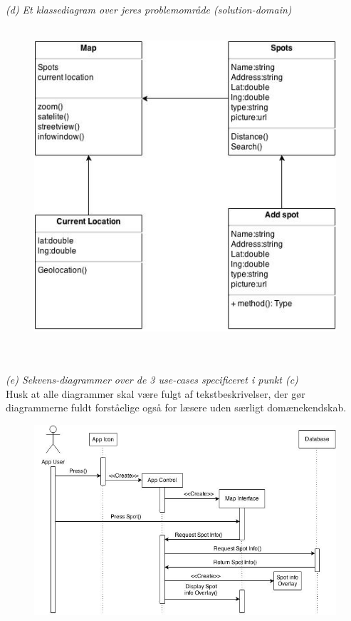 \documentclass[12pt]{article}
\begin{document}
\textit{(d) Et klassediagram over jeres problemområde (solution-domain)}\\\\
\begin{figure}[h]
\includegraphics[scale = 0.5]{cd}
\end{figure}\\\\
\newpage
\textit{(e) Sekvens-diagrammer over de 3 use-cases specificeret i punkt (c)}\\
Husk at alle diagrammer skal være fulgt af tekstbeskrivelser, der gør diagrammerne fuldt
forståelige også for læsere uden særligt domænekendskab.\\
\begin{figure}[h]
\includegraphics[scale = 0.5]{sekdia1}
\end{figure}
\end{document}
